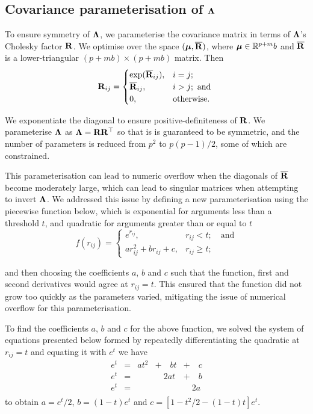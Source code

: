 \subsection{Covariance parameterisation of ${\boldsymbol \Lambda}$}
To ensure symmetry of ${\boldsymbol \Lambda}$, we parameterise the covariance matrix in
terms of ${\boldsymbol \Lambda}$'s Cholesky factor  ${\bf R}$. We optimise
over the space $({\boldsymbol \mu}, \overline{{\bf R}})$, where ${\boldsymbol \mu} \in {\mathbb{R}}^{p + m}b$ and
$\overline{{\bf R}}$ is a lower-triangular $(p + mb) \times (p + mb)$ matrix. Then
\begin{equation*}
	{\bf R}_{ij} =
	\begin{cases}
		\exp(\overline{{\bf R}}_{ij}), & i = j;\\
		\overline{{\bf R}}_{ij},       & i > j; \text{ and }\\
		0,                         & \text{otherwise}. 
	\end{cases}
\end{equation*}
		
\noindent We exponentiate the diagonal to ensure positive-definiteness of
${\bf R}$. We parameterise ${\boldsymbol \Lambda}$ as ${\boldsymbol \Lambda} = {\bf R} {\bf R}^\top$ so that is is
guaranteed to be symmetric, and the number of parameters is reduced from $p^2$
to $p(p-1)/2$, some of which are constrained. 

This parameterisation can lead to numeric overflow when the diagonals of
$\overline{{\bf R}}$ become moderately large, which can lead to singular matrices
when attempting to invert ${\boldsymbol \Lambda}$.  We addressed this issue by defining 
a new parameterisation using
the
piecewise function below, which is exponential for arguments less than 
a threshold
$t$, and
quadratic for arguments greater than or equal to $t$
\begin{equation}
\label{eq:piecewise_function}
f(r_{ij}) =
\begin{cases}
    e^{r_{ij}}, & r_{ij} < t;         \quad \mbox{and}           \\
    a r_{ij}^2 + b r_{ij} + c, & r_{ij} \geq t; 
\end{cases}
\end{equation}

\noindent and then choosing the coefficients $a$, $b$ and $c$ such that the
function, first and second derivatives would agree at $r_{ij} = t$. This
ensured that the function did not grow too quickly as the parameters varied,
mitigating the issue of numerical overflow for this parameterisation.

To find the coefficients $a$, $b$ and $c$ for the above function, we solved
the system of equations presented below formed by repeatedly  differentiating
the quadratic at $r_{ij} =  t$ and equating it with $e^t$ we have
\begin{equation}
\label{eq:system_of_equations}
\begin{array}{lllll}
	e^t & = & a t^2 & + \quad b t & + \quad c \\
	e^t & = &       & \quad 2a t  & + \quad b \\
	e^t & = &       &             & \quad 2a  \\
\end{array}
\end{equation}
\noindent to obtain $a = e^t / 2$, $b = (1 - t) e^t$ and $c = [1 - t^2/2 - (1 -
t) t] e^t$.

